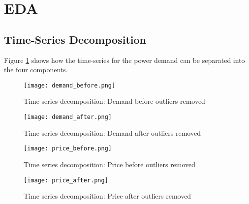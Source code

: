 \documentclass[11pt]{article}
\begin{document}



\newpage
\appendix

\section{EDA}
\label{appendix:further_eda}

\subsection{Time-Series Decomposition}

Figure \ref{fig:demand_before} shows how the time-series for the power demand can be separated into the four components.
\begin{figure}[H]
\centering
\begin{minipage}{.75\textwidth}
  \centering
  \texttt{[image: demand\_before.png]}
   \caption{Time series decomposition: Demand before outliers removed}
   \label{fig:demand_before}
\end{minipage}%
\end{figure}

\begin{figure}[H]
\centering
\begin{minipage}{.75\textwidth}
  \centering
  \texttt{[image: demand\_after.png]}
   \caption{Time series decomposition: Demand after outliers removed}
   \label{fig:demand_after}
\end{minipage}%
\end{figure}

\begin{figure}[H]
\centering
\begin{minipage}{.75\textwidth}
  \centering
  \texttt{[image: price\_before.png]}
   \caption{Time series decomposition: Price before outliers removed}
   \label{fig:price_before}
\end{minipage}%
\end{figure}

\begin{figure}[H]
\centering
\begin{minipage}{.75\textwidth}
  \centering
  \texttt{[image: price\_after.png]}
   \caption{Time series decomposition: Price after outliers removed}
   \label{fig:price_after}
\end{minipage}%
\end{figure}
\end{document}
